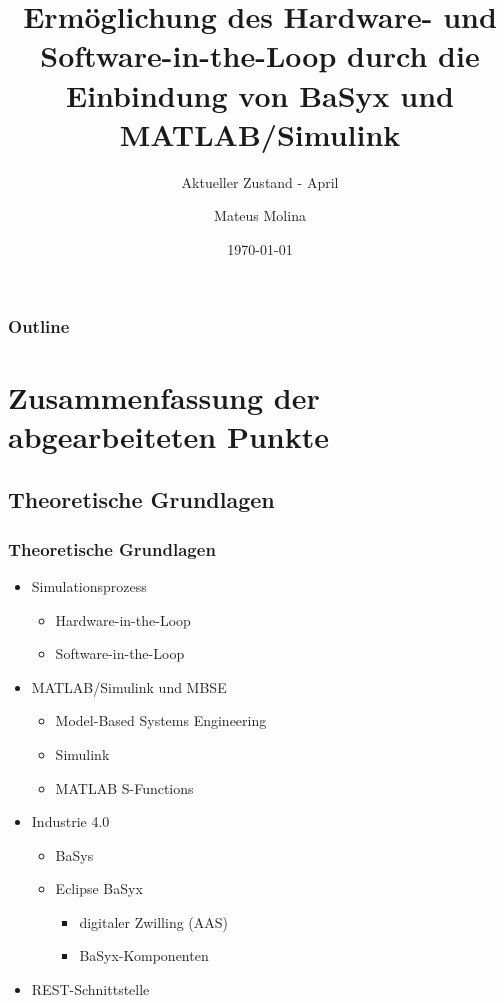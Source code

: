 \documentclass{beamer}
\title{Ermöglichung des Hardware- und Software-in-the-Loop durch die Einbindung von BaSyx und MATLAB/Simulink}
\subtitle{Aktueller Zustand - April}
\author{Mateus Molina}
\institute{Technische Universität Kaiserslautern}
\date{\today}
\begin{document}
\begin{frame}
\titlepage
\end{frame}

\begin{frame}
    \frametitle{Outline}
    \tableofcontents
\end{frame}

\section{Zusammenfassung der abgearbeiteten Punkte}

\subsection{Theoretische Grundlagen}
\begin{frame}
    \frametitle{Theoretische Grundlagen}
    \begin{itemize}
        \item Simulationsprozess
        \begin{itemize}
            \item Hardware-in-the-Loop
            \item Software-in-the-Loop
        \end{itemize}
        \item MATLAB/Simulink und MBSE
        \begin{itemize}
            \item Model-Based Systems Engineering
            \item Simulink
            \item MATLAB S-Functions
        \end{itemize}    
        \item Industrie 4.0
        \begin{itemize}
            \item BaSys
            \item Eclipse BaSyx
                \begin{itemize}
                    \item digitaler Zwilling (AAS)
                    \item BaSyx-Komponenten
                \end{itemize}
        \end{itemize}    
        \item REST-Schnittstelle
    \end{itemize}
\end{frame}
\end{document}
